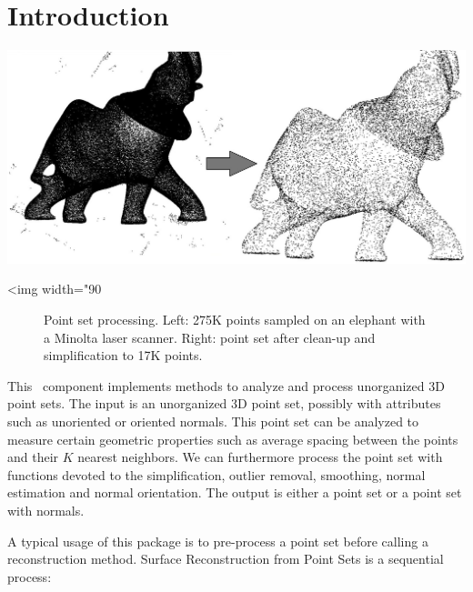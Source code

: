 \section{Introduction}

\begin{center}
    \label{Point_set_processing_3-fig-introduction}
    \begin{ccTexOnly}
        \includegraphics[width=1.0\textwidth]{Point_set_processing_3/introduction} %
    \end{ccTexOnly}
    \begin{ccHtmlOnly}
        <img width="90%
    \end{ccHtmlOnly}
    \begin{figure}[h]
        \caption{Point set processing.
                 Left: 275K points sampled on an elephant with
                 a Minolta laser scanner.
                 Right: point set after clean-up and
                 simplification to 17K points.}
    \end{figure}
\end{center}

This \cgal\ component implements methods to analyze and process unorganized 3D point sets. The input is an unorganized 3D point set, possibly with attributes such as unoriented or oriented normals. This point set can be analyzed to measure certain geometric properties such as average spacing between the points and their $K$ nearest neighbors. We can furthermore process the point set with functions devoted to the simplification, outlier removal, smoothing, normal estimation and normal orientation. The output is either a point set or a point set with normals.


A typical usage of this package is to pre-process a point set before calling a reconstruction method.
Surface Reconstruction from Point Sets is a sequential process:


